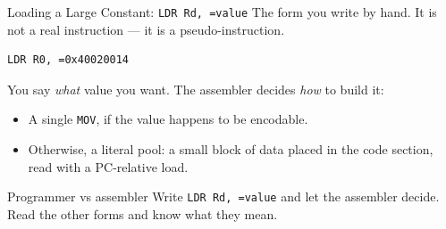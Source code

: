 \documentclass[9pt,aspectratio=169,xcolor=table]{beamer}
\begin{document}
\begin{frame}[fragile]{Loading a Large Constant: \texttt{LDR Rd, =value}}
    \leavevmode
    {\small The form you write by hand. It is not a real instruction ---
    it is a \alert{pseudo-instruction}.}

    \vspace{2mm}
    \begin{center}
    \begin{lstlisting}[style=armasm, language=ARM, basicstyle=\large\ttfamily]
	LDR R0, =0x40020014
    \end{lstlisting}
    \end{center}

    \vspace{3mm}
    {\small You say \emph{what} value you want. The assembler decides
    \emph{how} to build it:}

    \vspace{1mm}
    {\small
    \begin{itemize}\itemsep1pt
        \item A single \texttt{MOV}, if the value happens to be encodable.
        \item Otherwise, a \alert{literal pool}: a small block of data
              placed in the code section, read with a PC-relative load.
    \end{itemize}}

    \vspace{3mm}
    \begin{block}{Programmer vs assembler}
        Write \texttt{LDR Rd, =value} and let the assembler decide. Read
        the other forms and know what they mean.
    \end{block}
\end{frame}
\end{document}
